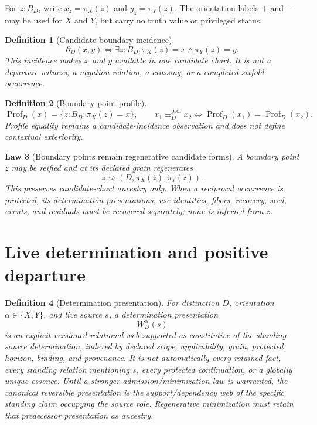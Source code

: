 \documentclass[11pt,oneside]{article}
\newtheorem{definition}{Definition}[section]
\newtheorem{law}[definition]{Law}
\newcommand{\Prof}{\operatorname{Prof}}
\begin{document}
For \(z:B_D\), write \(x_z=\pi_X(z)\) and \(y_z=\pi_Y(z)\).  The orientation labels \(+\) and \(-\) may be used for \(X\) and \(Y\), but carry no truth value or privileged status.

\begin{definition}[Candidate boundary incidence]\label{def:boundary-incidence}
\[
\boxed{
\partial_D(x,y)
\iff
\exists z:B_D.\,\pi_X(z)=x\land\pi_Y(z)=y.
}
\]
This incidence makes \(x\) and \(y\) available in one candidate chart.  It is not a departure witness, a negation relation, a crossing, or a completed sixfold occurrence.
\end{definition}

\begin{definition}[Boundary-point profile]
\[
\Prof_D(x)=\{z:B_D:\pi_X(z)=x\},
\qquad
x_1\equiv_D^{\mathrm{prof}}x_2
\iff
\Prof_D(x_1)=\Prof_D(x_2).
\]
Profile equality remains a candidate-incidence observation and does not define contextual exteriority.
\end{definition}

\begin{law}[Boundary points remain regenerative candidate forms]\label{law:boundary-point-regeneration}
A boundary point \(z\) may be reified and at its declared grain regenerates
\[
z\rightsquigarrow(D,\pi_X(z),\pi_Y(z)).
\]
This preserves candidate-chart ancestry only.  When a reciprocal occurrence is protected, its determination presentations, use identities, fibers, recovery, seed, events, and residuals must be recovered separately; none is inferred from \(z\).
\end{law}

\section{Live determination and positive departure}

\begin{definition}[Determination presentation]\label{def:determination-presentation}
For distinction \(D\), orientation \(\alpha\in\{X,Y\}\), and live source \(s\), a determination presentation
\[
\boxed{W_D^\alpha(s)}
\]
is an explicit versioned relational web supported as constitutive of the standing source determination, indexed by declared scope, applicability, grain, protected horizon, binding, and provenance.  It is not automatically every retained fact, every standing relation mentioning \(s\), every protected continuation, or a globally unique essence.  Until a stronger admission/minimization law is warranted, the canonical reversible presentation is the support/dependency web of the specific standing claim occupying the source role.  Regenerative minimization must retain that predecessor presentation as ancestry.
\end{definition}
\end{document}
